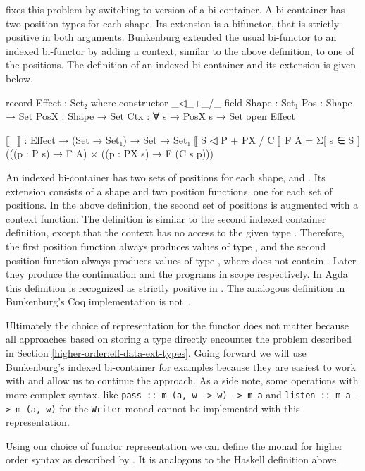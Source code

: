 \textcite{bunkenburg2019modeling} fixes this problem by switching to version of
a bi-container.
A bi-container has two position types for each shape.
Its extension is a bifunctor, that is strictly positive in both arguments.
Bunkenburg extended the usual bi-functor to an indexed bi-functor by adding a
context, similar to the above definition, to one of the positions.
The definition of an indexed bi-container and its extension is given below.

\begin{code}
record Effect : Set₂ where
  constructor _◁_+_/_
  field
    Shape : Set₁
    Pos : Shape → Set
    PosX : Shape → Set
    Ctx : ∀ s → PosX s → Set
open Effect

⟦_⟧ : Effect → (Set → Set₁) → Set → Set₁
⟦ S ◁ P + PX / C ⟧ F A = Σ[ s ∈ S ] (((p : P s) → F A) × ((p : PX s) → F (C s p)))
\end{code}
An indexed bi-container has two sets of positions for each shape, 
and .
Its extension consists of a shape and two position functions, one for each set
of positions.
In the above definition, the second set of positions is augmented with a context
function.
The definition is similar to the second indexed container definition, except
that the context has no access to the given type .
Therefore, the first position function always produces values of type
, and the second position function always produces values of
type , where  does not contain
.
Later they produce the continuation and the programs in scope respectively.
In Agda this definition is recognized as strictly positive in .
The analogous definition in Bunkenburg's Coq implementation is
not~\cite{bunkenburg2019modeling}.
 
Ultimately the choice of representation for the functor does not matter because
all approaches based on storing a type directly encounter the problem described
in Section \ref{higher-order:eff-data-ext-types}.
Going forward we will use Bunkenburg's indexed bi-container for examples because
they are easiest to work with and allow us to continue the approach.
As a side note, some operations with more complex syntax, like
\texttt{pass :: m (a, w -> w) -> m a} and
\texttt{listen :: m a -> m (a, w)} for the 
\texttt{Writer} monad cannot be implemented with this
representation.
 
Using our choice of functor representation we can define the 
monad for higher order syntax as described by
\textcite{DBLP:conf/haskell/WuSH14}.
It is analogous to the Haskell definition above.

